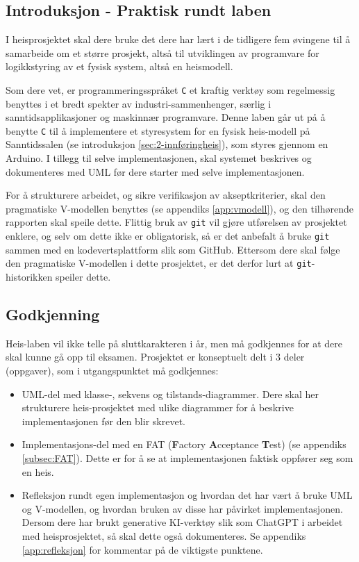 
\begin{alphasection}

\section{Introduksjon - Praktisk rundt laben}
I heisprosjektet skal dere bruke det dere har lært i de tidligere fem øvingene til å samarbeide om et større prosjekt, altså til utviklingen av programvare for logikkstyring av et fysisk system, altså en heismodell.

Som dere vet, er programmeringsspråket \verb|C| et kraftig verktøy som regelmessig benyttes i et bredt spekter av industri-sammenhenger, særlig i sanntidsapplikasjoner og maskinnær programvare. Denne laben går ut på å benytte \verb|C| til å implementere et styresystem for en fysisk heis-modell på Sanntidssalen (se introduksjon \ref{sec:2-innføringheis}), som styres gjennom en Arduino. I tillegg til selve implementasjonen, skal systemet beskrives og dokumenteres med UML før dere starter med selve implementasjonen.

For å strukturere arbeidet, og sikre verifikasjon av akseptkriterier, skal den pragmatiske V-modellen benyttes (se appendiks \ref{app:vmodell}), og den tilhørende rapporten skal speile dette. Flittig bruk av \verb|git| vil gjøre utførelsen av prosjektet enklere, og selv om dette ikke er obligatorisk, så er det anbefalt å bruke \verb|git| sammen med en kodevertsplattform slik som GitHub. Ettersom dere skal følge den pragmatiske V-modellen i dette prosjektet, er det derfor lurt at \verb|git|-historikken speiler dette.

\subsection*{Godkjenning}

Heis-laben vil ikke telle på sluttkarakteren i år, men må godkjennes for at dere skal kunne gå opp til eksamen. Prosjektet er konseptuelt delt i 3 deler (oppgaver), som i utgangspunktet må godkjennes:
\begin{itemize}
    \item UML-del med klasse-, sekvens og tilstands-diagrammer. Dere skal her strukturere heis-prosjektet med ulike diagrammer for å beskrive implementasjonen før den blir skrevet.
    \item Implementasjons-del med en FAT (\textbf{F}actory \textbf{A}cceptance \textbf{T}est) (se appendiks \ref{subsec:FAT}). Dette er for å se at implementasjonen faktisk oppfører seg som en heis.
    \item Refleksjon rundt egen implementasjon og hvordan det har vært å bruke UML og V-modellen, og hvordan bruken av disse har påvirket implementasjonen. Dersom dere har brukt generative KI-verktøy slik som ChatGPT i arbeidet med heisprosjektet, så skal dette også dokumenteres. Se appendiks \ref{app:refleksjon} for kommentar på de viktigste punktene.
\end{itemize}


\end{alphasection}
